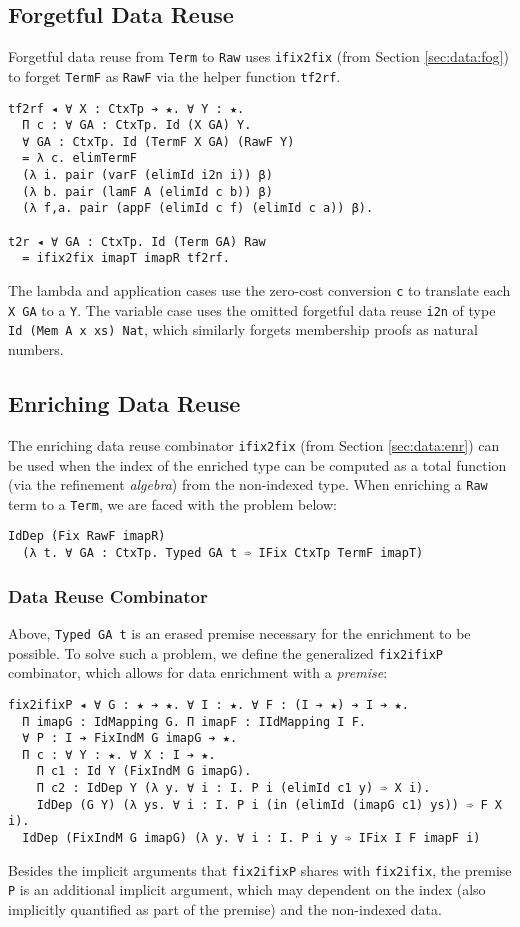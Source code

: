 \documentclass[acmsmall]{acmart}\settopmatter{}
\newcommand{\refsec}[1]{Section \ref{sec:#1}}
\newcommand{\labsec}[1]{\label{sec:#1}}
\begin{document}
\subsection{Forgetful Data Reuse}
\labsec{rel:dfog}

Forgetful data reuse from \verb;Term; to \verb;Raw; uses
\verb;ifix2fix; (from \refsec{data:fog}) to forget
\verb;TermF; as \verb;RawF; via the helper function
\verb;tf2rf;. 
\begin{verbatim}
tf2rf ◂ ∀ X : CtxTp ➔ ★. ∀ Y : ★.
  Π c : ∀ GA : CtxTp. Id (X GA) Y.
  ∀ GA : CtxTp. Id (TermF X GA) (RawF Y)
  = λ c. elimTermF
  (λ i. pair (varF (elimId i2n i)) β)
  (λ b. pair (lamF A (elimId c b)) β)
  (λ f,a. pair (appF (elimId c f) (elimId c a)) β).

t2r ◂ ∀ GA : CtxTp. Id (Term GA) Raw
  = ifix2fix imapT imapR tf2rf.
\end{verbatim}
The lambda and application cases use the zero-cost conversion \verb;c;
to translate each \verb;X GA; to a \verb;Y;. The variable case uses the
omitted forgetful data reuse \verb;i2n; of type
\verb;Id (Mem A x xs) Nat;, which similarly forgets membership proofs
as natural numbers.

\subsection{Enriching Data Reuse}
\labsec{rel:denr}

The enriching data reuse combinator \verb;ifix2fix; (from
\refsec{data:enr}) can be used when the index of the enriched type can
be computed as a total function (via the refinement \textit{algebra}) from
the non-indexed type.
When enriching a \verb;Raw; term to a
\verb;Term;, we are faced with the problem below:
\begin{verbatim}
IdDep (Fix RawF imapR) 
  (λ t. ∀ GA : CtxTp. Typed GA t ➾ IFix CtxTp TermF imapT)
\end{verbatim}

\subsubsection{Data Reuse Combinator}

Above, \verb;Typed GA t; is an erased premise necessary for the
enrichment to be possible. To solve such a problem, we define the
generalized \verb;fix2ifixP; combinator, which allows for data
enrichment with a \textit{premise}:
\begin{verbatim}
fix2ifixP ◂ ∀ G : ★ ➔ ★. ∀ I : ★. ∀ F : (I ➔ ★) ➔ I ➔ ★.
  Π imapG : IdMapping G. Π imapF : IIdMapping I F.
  ∀ P : I ➔ FixIndM G imapG ➔ ★.
  Π c : ∀ Y : ★. ∀ X : I ➔ ★.
    Π c1 : Id Y (FixIndM G imapG).
    Π c2 : IdDep Y (λ y. ∀ i : I. P i (elimId c1 y) ➾ X i).
    IdDep (G Y) (λ ys. ∀ i : I. P i (in (elimId (imapG c1) ys)) ➾ F X i).
  IdDep (FixIndM G imapG) (λ y. ∀ i : I. P i y ➾ IFix I F imapF i)
\end{verbatim}
Besides the implicit arguments that \verb;fix2ifixP; shares with
\verb;fix2ifix;, the premise \verb;P; is an additional implicit
argument, which may dependent on the index (also implicitly quantified
as part of the premise) and the non-indexed data.
\end{document}
